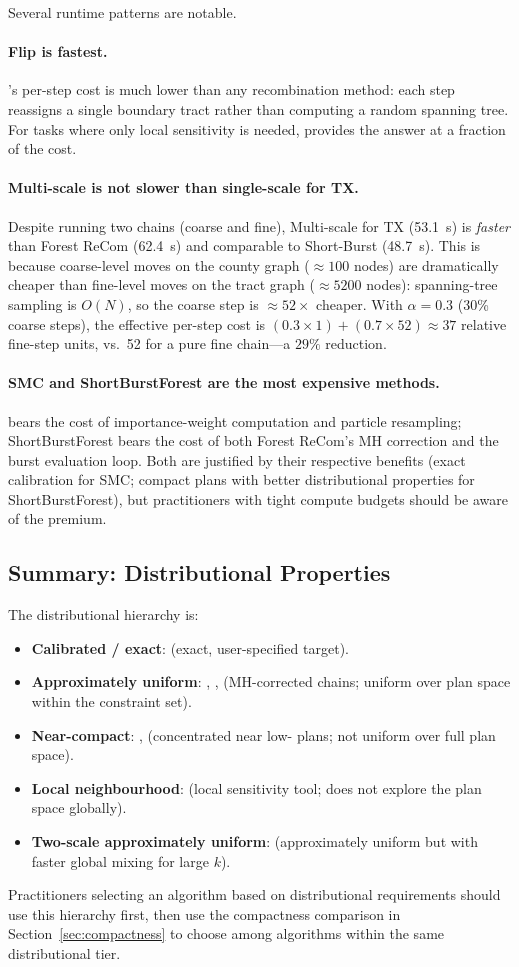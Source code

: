 Several runtime patterns are notable.

\paragraph{Flip is fastest.}
\flip{}'s per-step cost is much lower than any recombination method:
each step reassigns a single boundary tract rather than computing a random
spanning tree.
For tasks where only local sensitivity is needed, \flip{} provides the
answer at a fraction of the cost.

\paragraph{Multi-scale is not slower than single-scale for TX.}
Despite running two chains (coarse and fine), Multi-scale for TX (53.1~s)
is \emph{faster} than Forest ReCom (62.4~s) and comparable to Short-Burst
(48.7~s).
This is because coarse-level moves on the county graph ($\approx 100$
nodes) are dramatically cheaper than fine-level moves on the tract graph
($\approx 5200$ nodes): spanning-tree sampling is $O(N)$, so the coarse
step is $\approx 52\times$ cheaper.
With $\alpha = 0.3$ (30\% coarse steps), the effective per-step cost is
$(0.3 \times 1) + (0.7 \times 52) \approx 37$ relative fine-step units,
vs.\ 52 for a pure fine chain---a $29\%$ reduction.

\paragraph{SMC and ShortBurstForest are the most expensive methods.}
\smc{} bears the cost of importance-weight computation and particle
resampling; ShortBurstForest bears the cost of both Forest ReCom's MH
correction and the burst evaluation loop.
Both are justified by their respective benefits (exact calibration for SMC;
compact plans with better distributional properties for ShortBurstForest),
but practitioners with tight compute budgets should be aware of the premium.

\subsection{Summary: Distributional Properties}

The distributional hierarchy is:
\begin{itemize}
  \item \textbf{Calibrated / exact}: \smc{} (exact, user-specified target).
  \item \textbf{Approximately uniform}: \fr{}, \msp{}, \vra{} (MH-corrected
        chains; uniform over plan space within the constraint set).
  \item \textbf{Near-compact}: \sburst{}, \sburstf{} (concentrated near low-\ec{}
        plans; not uniform over full plan space).
  \item \textbf{Local neighbourhood}: \flip{} (local sensitivity tool; does
        not explore the plan space globally).
  \item \textbf{Two-scale approximately uniform}: \ms{} (approximately
        uniform but with faster global mixing for large $k$).
\end{itemize}

Practitioners selecting an algorithm based on distributional requirements
should use this hierarchy first, then use the compactness comparison in
Section~\ref{sec:compactness} to choose among algorithms within the same
distributional tier.
